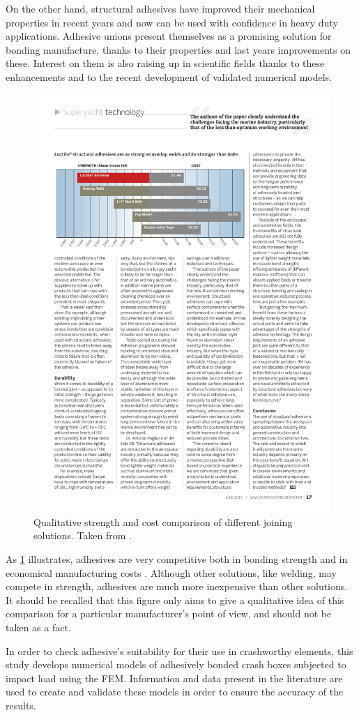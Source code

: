 \documentclass[cmfonts]{witpress}
\begin{document}
On the other hand, structural adhesives have improved their mechanical properties in recent years and now can be used with confidence in heavy duty applications. Adhesive unions present themselves as a promising solution for bonding manufacture, thanks to their properties and last years improvements on these. Interest on them is also raising up in scientific fields thanks to these enhancements and to the recent development of validated numerical models.
\begin{figure}
	\centering
	\includegraphics[width=0.7\linewidth]{./figures/IMG_CUTRES/comparison}
	\caption[Qualitative strength and cost comparison of different joining solutions.]{Qualitative strength and cost comparison of different joining solutions. Taken from \cite{superyacht}.}
	\label{fig:comparison}
\end{figure}

As \cref{fig:comparison} illustrates, adhesives are very competitive both in bonding strength and in economical manufacturing costs \cite{superyacht}. Although other solutions, like welding, may compete in strength, adhesives are much more inexpensive than other solutions. It should be recalled that this figure only aims to give a qualitative idea of this comparison for a particular manufacturer's point of view, and should not be taken as a fact.

In order to check adhesive's suitability for their use in crashworthy elements, this study develops numerical models of adhesively bonded crash boxes subjected to impact load  using the FEM. Information and data present in the literature are used to create and validate these models in order to ensure the accuracy of the results.
\end{document}
